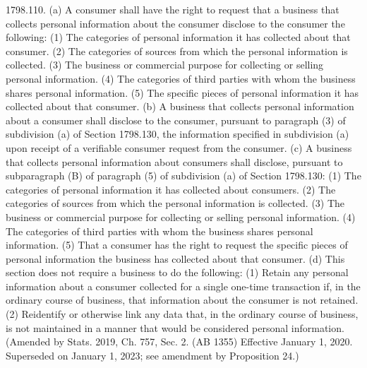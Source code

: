 1798.110.  (a) A consumer shall have the right to request that a business that collects personal information about the consumer disclose to the consumer the following:
(1) The categories of personal information it has collected about that consumer.
(2) The categories of sources from which the personal information is collected.
(3) The business or commercial purpose for collecting or selling personal information.
(4) The categories of third parties with whom the business shares personal information.
(5) The specific pieces of personal information it has collected about that consumer.
(b) A business that collects personal information about a consumer shall disclose to the consumer, pursuant to paragraph (3) of subdivision (a) of Section 1798.130, the information specified in subdivision (a) upon receipt of a verifiable consumer request from the consumer.
(c) A business that collects personal information about consumers shall disclose, pursuant to subparagraph (B) of paragraph (5) of subdivision (a) of Section 1798.130:
(1) The categories of personal information it has collected about consumers.
(2) The categories of sources from which the personal information is collected.
(3) The business or commercial purpose for collecting or selling personal information.
(4) The categories of third parties with whom the business shares personal information.
(5) That a consumer has the right to request the specific pieces of personal information the business has collected about that consumer.
(d) This section does not require a business to do the following:
(1) Retain any personal information about a consumer collected for a single one-time transaction if, in the ordinary course of business, that information about the consumer is not retained.
(2) Reidentify or otherwise link any data that, in the ordinary course of business, is not maintained in a manner that would be considered personal information.
(Amended by Stats. 2019, Ch. 757, Sec. 2. (AB 1355) Effective January 1, 2020. Superseded on January 1, 2023; see amendment by Proposition 24.)

